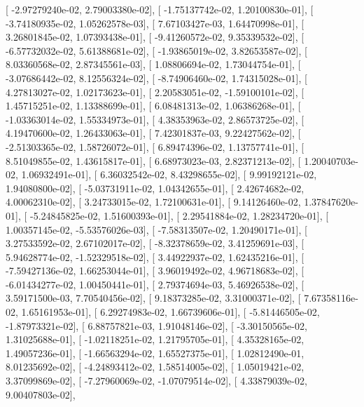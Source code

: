 \documentclass{article}
\begin{document}
       [ -2.97279240e-02,   2.79003380e-02],
       [ -1.75137742e-02,   1.20100830e-01],
       [ -3.74180935e-02,   1.05262578e-03],
       [  7.67103427e-03,   1.64470998e-01],
       [  3.26801845e-02,   1.07393438e-01],
       [ -9.41260572e-02,   9.35339532e-02],
       [ -6.57732032e-02,   5.61388681e-02],
       [ -1.93865019e-02,   3.82653587e-02],
       [  8.03360568e-02,   2.87345561e-03],
       [  1.08806694e-02,   1.73044754e-01],
       [ -3.07686442e-02,   8.12556324e-02],
       [ -8.74906460e-02,   1.74315028e-01],
       [  4.27813027e-02,   1.02173623e-01],
       [  2.20583051e-02,  -1.59100101e-02],
       [  1.45715251e-02,   1.13388699e-01],
       [  6.08481313e-02,   1.06386268e-01],
       [ -1.03363014e-02,   1.55334973e-01],
       [  4.38353963e-02,   2.86573725e-02],
       [  4.19470600e-02,   1.26433063e-01],
       [  7.42301837e-03,   9.22427562e-02],
       [ -2.51303365e-02,   1.58726072e-01],
       [  6.89474396e-02,   1.13757741e-01],
       [  8.51049855e-02,   1.43615817e-01],
       [  6.68973023e-03,   2.82371213e-02],
       [  1.20040703e-02,   1.06932491e-01],
       [  6.36032542e-02,   8.43298655e-02],
       [  9.99192121e-02,   1.94080800e-02],
       [ -5.03731911e-02,   1.04342655e-01],
       [  2.42674682e-02,   4.00062310e-02],
       [  3.24733015e-02,   1.72100631e-01],
       [  9.14126460e-02,   1.37847620e-01],
       [ -5.24845825e-02,   1.51600393e-01],
       [  2.29541884e-02,   1.28234720e-01],
       [  1.00357145e-02,  -5.53576026e-03],
       [ -7.58313507e-02,   1.20490171e-01],
       [  3.27533592e-02,   2.67102017e-02],
       [ -8.32378659e-02,   3.41259691e-03],
       [  5.94628774e-02,  -1.52329518e-02],
       [  3.44922937e-02,   1.62435216e-01],
       [ -7.59427136e-02,   1.66253044e-01],
       [  3.96019492e-02,   4.96718683e-02],
       [ -6.01434277e-02,   1.00450441e-01],
       [  2.79374694e-03,   5.46926538e-02],
       [  3.59171500e-03,   7.70540456e-02],
       [  9.18373285e-02,   3.31000371e-02],
       [  7.67358116e-02,   1.65161953e-01],
       [  6.29274983e-02,   1.66739606e-01],
       [ -5.81446505e-02,  -1.87973321e-02],
       [  6.88757821e-03,   1.91048146e-02],
       [ -3.30150565e-02,   1.31025688e-01],
       [ -1.02118251e-02,   1.21795705e-01],
       [  4.35328165e-02,   1.49057236e-01],
       [ -1.66563294e-02,   1.65527375e-01],
       [  1.02812490e-01,   8.01235692e-02],
       [ -4.24893412e-02,   1.58514005e-02],
       [  1.05019421e-02,   3.37099869e-02],
       [ -7.27960069e-02,  -1.07079514e-02],
       [  4.33879039e-02,   9.00407803e-02],
\end{document}
